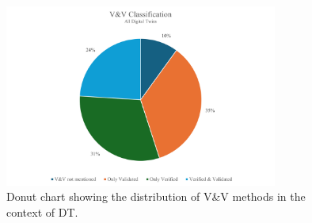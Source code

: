\begin{figure}[htbp]
  \centering
  \includegraphics[width=0.8\textwidth]{figures/vvbitencourt.png}
  \caption{Donut chart showing the distribution of V&V methods in the context of DT.}
  \label{fig:vvbitencourt}
\end{figure}

